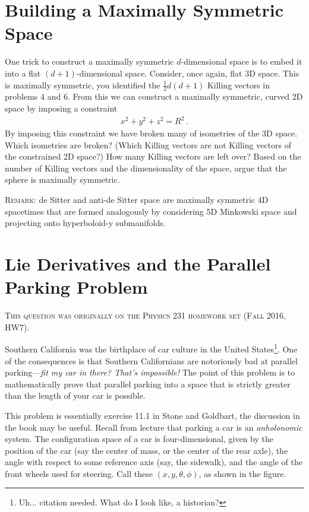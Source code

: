 \documentclass[12pt]{article}
\numberwithin{equation}{section}    %
\begin{document}
\section{Building a Maximally Symmetric Space}


One trick to construct a maximally symmetric $d$-dimensional space is to embed it into a flat $(d+1)$-dimensional space. Consider, once again, flat 3D space. This is maximally symmetric, you identified the $\frac 12 d(d+1)$ Killing vectors in problems 4 and 6.  From this we can construct a maximally symmetric, curved 2D space by imposing a constraint
\begin{align}
	x^2 + y^2 + z^2 = R^2 \ .
\end{align}
By imposing this constraint we have broken many of isometries of the 3D space. Which isometries are broken? (Which Killing vectors are not Killing vectors of the constrained 2D space?) How many Killing vectors are left over? Based on the number of Killing vectors and the dimensionality of the space, argue that the sphere is maximally symmetric.

\textsc{Remark}: de Sitter and anti-de Sitter space are maximally symmetric 4D spacetimes that are formed analogously by considering 5D Minkowski space and projecting onto hyperboloid-y submanifolds. 



\section{Lie Derivatives and the Parallel Parking Problem}

\textsc{This question was originally on the Physics 231 homework set (Fall 2016, HW7).}

Southern California was the birthplace of car culture in the United States\footnote{Uh... citation needed. What do I look like, a historian?}. One of the consequences is that Southern Californians are notoriously bad at parallel parking---\emph{fit my car in there? That's impossible!} The point of this problem is to mathematically prove that parallel parking into a space that is strictly greater than the length of your car is possible.

This problem is essentially exercise 11.1 in Stone and Goldbart, the discussion in the book may be useful. Recall from lecture that parking a car is an \emph{anholonomic} system. The configuration space of a car is four-dimensional, given by the position of the car (say the center of mass, or the center of the rear axle), the angle with respect to some reference axis (say, the sidewalk), and the angle of the front wheels used for steering. Call these $(x,y,\theta,\phi)$, as shown in the figure.
\end{document}
